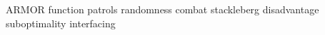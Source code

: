 ARMOR
	function
	patrols
	randomness
		combat stackleberg disadvantage
	suboptimality
	interfacing
	
